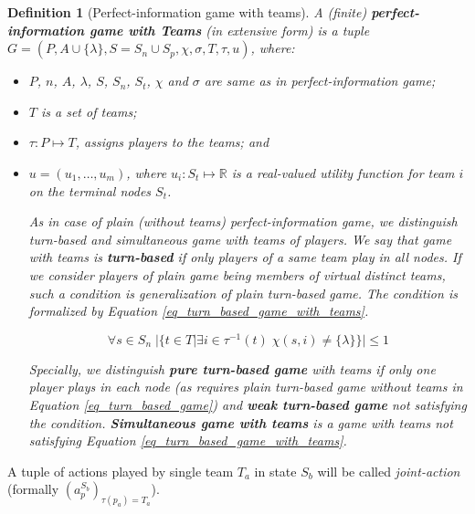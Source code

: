 \newtheorem*{defpigt}{Definition}
\begin{defpigt}[Perfect-information game with teams]

A (finite) \textbf{perfect-information game with Teams} (in extensive form) is a tuple $G =
(P,A\cup\{\lambda\}, S=S_n\cup S_p, \chi, \sigma, T, \tau, u)$, where:


\begin{itemize}

\item $P$, $n$, $A$, $\lambda$, $S$, $S_n$, $S_t$, $\chi$ and $\sigma$ are same as in
perfect-information game;

\item $T$ is a set of teams;

\item $\tau: P \mapsto T$, assigns players to the teams; and

\item $u = (u_1,\ldots,u_m)$, where $u_i: S_t \mapsto \mathbb{R}$ is a real-valued utility
function for team $i$ on the terminal nodes $S_t$.

As in case of plain (without teams) perfect-information game, we distinguish turn-based and 
simultaneous game with teams of players. We say that game with teams is \textbf{turn-based} 
if only players of a same team play in all nodes. If we consider players of plain game being
members of virtual distinct teams, such a condition is generalization of plain turn-based game.
The condition is formalized by Equation \ref{eq_turn_based_game_with_teams}.

\begin{equation}
\label{eq_turn_based_game_with_teams}
\forall s \in S_n \; |\{t \in T|\exists i \in \tau^{-1}(t)\;\chi(s,i) \not= \{\lambda\}\}| \le 1
\end{equation}

Specially, we distinguish 
\textbf{pure turn-based game} with teams if only one player plays in each node (as requires
plain turn-based game without teams in Equation \ref{eq_turn_based_game}) and 
\textbf{weak turn-based game} not satisfying the condition. \textbf{Simultaneous game with
teams} is a game with teams not satisfying Equation \ref{eq_turn_based_game_with_teams}.


\end{itemize}

\end{defpigt}

A tuple of actions played by single team $T_a$ in state $S_b$ will be called \emph{joint-action} (formally
$(a_p^{S_b})_{\tau(p_a)=T_a}$).


